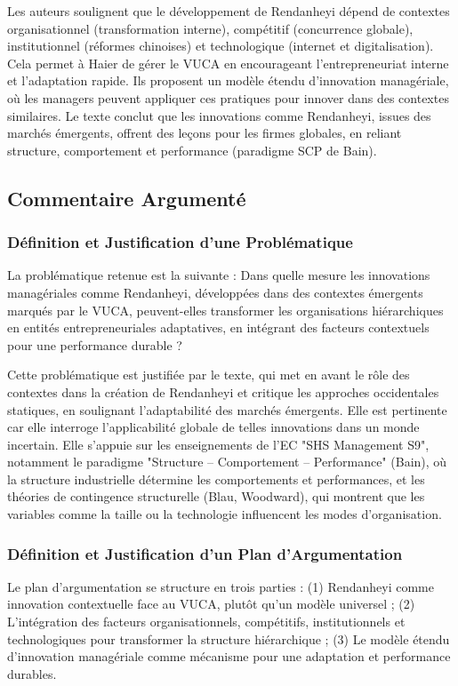 \documentclass{rapportECL}
\begin{document}
Les auteurs soulignent que le développement de Rendanheyi dépend de contextes organisationnel (transformation interne), compétitif (concurrence globale), institutionnel (réformes chinoises) et technologique (internet et digitalisation). Cela permet à Haier de gérer le VUCA en encourageant l'entrepreneuriat interne et l'adaptation rapide. Ils proposent un modèle étendu d'innovation managériale, où les managers peuvent appliquer ces pratiques pour innover dans des contextes similaires. Le texte conclut que les innovations comme Rendanheyi, issues des marchés émergents, offrent des leçons pour les firmes globales, en reliant structure, comportement et performance (paradigme SCP de Bain).

\subsection{Commentaire Argumenté}

\subsubsection{Définition et Justification d’une Problématique}
La problématique retenue est la suivante : Dans quelle mesure les innovations managériales comme Rendanheyi, développées dans des contextes émergents marqués par le VUCA, peuvent-elles transformer les organisations hiérarchiques en entités entrepreneuriales adaptatives, en intégrant des facteurs contextuels pour une performance durable ?

Cette problématique est justifiée par le texte, qui met en avant le rôle des contextes dans la création de Rendanheyi et critique les approches occidentales statiques, en soulignant l'adaptabilité des marchés émergents. Elle est pertinente car elle interroge l'applicabilité globale de telles innovations dans un monde incertain. Elle s’appuie sur les enseignements de l’EC "SHS Management S9", notamment le paradigme "Structure – Comportement – Performance" (Bain), où la structure industrielle détermine les comportements et performances, et les théories de contingence structurelle (Blau, Woodward), qui montrent que les variables comme la taille ou la technologie influencent les modes d'organisation.

\subsubsection{Définition et Justification d’un Plan d’Argumentation}
Le plan d’argumentation se structure en trois parties : (1) Rendanheyi comme innovation contextuelle face au VUCA, plutôt qu'un modèle universel ; (2) L'intégration des facteurs organisationnels, compétitifs, institutionnels et technologiques pour transformer la structure hiérarchique ; (3) Le modèle étendu d'innovation managériale comme mécanisme pour une adaptation et performance durables.
\end{document}
